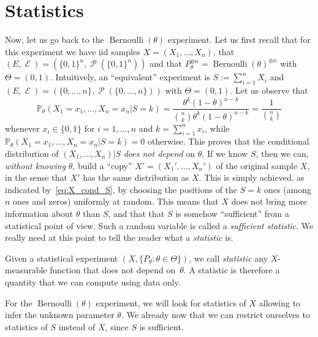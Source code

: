 \documentclass[
	fontsize=11pt, %
	twoside=false, %
	numbers=noenddot, %
]{kaobook}
\DeclareMathOperator{\cE}{\mathcal E}
\DeclareMathOperator{\cP}{\mathcal P}
\DeclareMathOperator{\ber}{Bernoulli}
\renewcommand{\P}{\mathbb P}
\begin{document}
\section{Statistics}

Now, let us go back to the $\ber(\theta)$ experiment.
Let us first recall that for this experiment we have iid samples $X = (X_1, \ldots, X_n)$, that
$(E, \cE) = (\{0, 1\}^n, \cP(\{0, 1\}^n))$ and that $P_\theta^{\otimes n} = \ber(\theta)^{\otimes n}$ with $\Theta = (0, 1)$.
Intuitively, an ``equivalent'' experiment is $S := \sum_{i=1}^n X_i$ and $(E, \cE) = (\{ 0, \ldots, n\}, \cP(\{0, \ldots, n\}))$ with $\Theta = (0, 1)$.
Let us observe that
\begin{equation}
	\label{eq:X_cond_S}
	\P_\theta (X_1 = x_1, \ldots, X_n = x_n | S = k) = 
	\frac{\theta^k (1 - \theta)^{n-k}}{\binom{n}{k} \theta^k (1 - \theta)^{n-k}} 
	= \frac{1}{\binom{n}{k}}
\end{equation}
whenever $x_i \in \{ 0, 1 \}$ for $i=1, \ldots, n$ and $k = \sum_{i=1}^n x_i$, while $\P_\theta (X_1 = x_1, \ldots, X_n = x_n | S = k) = 0$ otherwise.
This proves that the conditional distribution of $(X_1, \ldots, X_n) | S$ \emph{does not depend} on $\theta$.
If we know $S$, then we can, \emph{without knowing} $\theta$, build a ``copy'' $X' = (X_1', \ldots, X_n')$ of the original sample $X$, in the sense that $X'$ has the same distribution as $X$.
This is simply achieved, as indicated by~\eqref{eq:X_cond_S}, by choosing the positions of the $S=k$ ones (among $n$ ones and zeros) uniformly at random.
This means that $X$ does not bring more information about $\theta$ than $S$, and that that $S$ is somehow ``sufficient'' from a statistical point of view.
Such a random variable is called a \emph{sufficient statistic}.
We really need at this point to tell the reader what a \emph{statistic} is.
\begin{definition}
	Given a statistical experiment $(X, \{ P_\theta : \theta \in \Theta \})$, we call \emph{statistic} any $X$-measurable function that does not depend on~$\theta$.
	A statistic is therefore a quantity that we can compute using data only.
\end{definition}
For the $\ber(\theta)$ experiment, we will look for statistics of $X$ allowing to infer the unknown parameter $\theta$.
We already now that we can restrict ourselves to statistics of $S$ instead of $X$, since $S$ is  sufficient.
\end{document}
